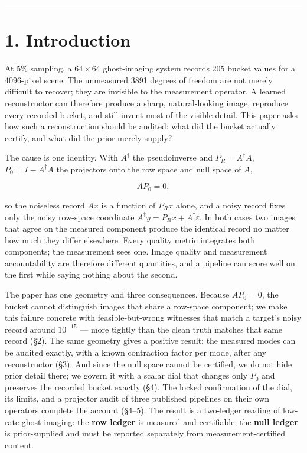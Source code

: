 \documentclass[11pt]{article}
\begin{document}
\medskip\hrule\medskip

\section*{1. Introduction}

At 5\% sampling, a $64\times64$ ghost-imaging system records 205 bucket values for a 4096-pixel scene. The unmeasured 3891 degrees of freedom are not merely difficult to recover; they are invisible to the measurement operator. A learned reconstructor can therefore produce a sharp, natural-looking image, reproduce every recorded bucket, and still invent most of the visible detail. This paper asks how such a reconstruction should be audited: what did the bucket actually certify, and what did the prior merely supply?

The cause is one identity. With $A^\dagger$ the pseudoinverse and $P_R = A^\dagger A$, $P_0 = I - A^\dagger A$ the projectors onto the row space and null space of $A$,

$$A P_0 = 0,$$

so the noiseless record $Ax$ is a function of $P_R x$ alone, and a noisy record fixes only the noisy row-space coordinate $A^\dagger y = P_R x + A^\dagger\varepsilon$. In both cases two images that agree on the measured component produce the identical record no matter how much they differ elsewhere. Every quality metric integrates both components; the measurement sees one. Image quality and measurement accountability are therefore different quantities, and a pipeline can score well on the first while saying nothing about the second.

The paper has one geometry and three consequences. Because $A P_0 = 0$, the bucket cannot distinguish images that share a row-space component; we make this failure concrete with feasible-but-wrong witnesses that match a target's noisy record around $10^{-15}$ --- more tightly than the clean truth matches that same record (§2). The same geometry gives a positive result: the measured modes can be audited exactly, with a known contraction factor per mode, after any reconstructor (§3). And since the null space cannot be certified, we do not hide prior detail there; we govern it with a scalar dial that changes only $P_0$ and preserves the recorded bucket exactly (§4). The locked confirmation of the dial, its limits, and a projector audit of three published pipelines on their own operators complete the account (§4--5). The result is a two-ledger reading of low-rate ghost imaging: the \textbf{row ledger} is measured and certifiable; the \textbf{null ledger} is prior-supplied and must be reported separately from measurement-certified content.
\end{document}
